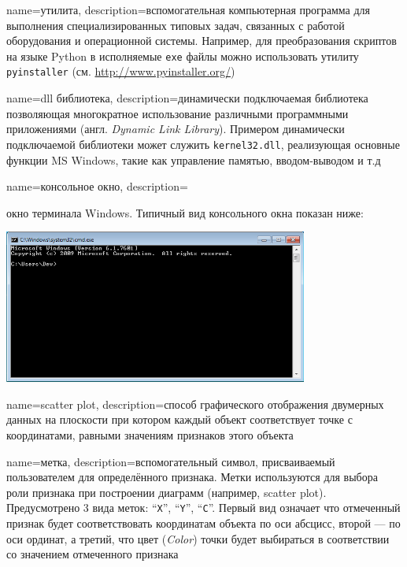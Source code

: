 {
	name=утилита,
	description={вспомогательная компьютерная программа для выполнения специализированных типовых задач, связанных с работой оборудования и операционной системы. Например, для преобразования скриптов на языке Python в исполняемые \texttt{exe} файлы можно использовать утилиту \texttt{pyinstaller} (см. \url{http://www.pyinstaller.org/})}
}

{
	name=dll библиотека,
	description={динамически подключаемая библиотека позволяющая многократное использование различными программными приложениями (англ. \textit{Dynamic Link Library}). Примером динамически подключаемой библиотеки может служить \texttt{kernel32.dll}, реализующая основные функции MS Windows, такие как управление памятью, вводом-выводом и т.д}
}

{
	name=консольное окно,
	description={окно терминала Windows. Типичный вид консольного окна показан ниже:
	\newline\begin{center}
		\includegraphics[width=0.75\textwidth]{img/terminalexample}
	\end{center}}
}

{
	name=scatter plot,
	description={способ графического отображения двумерных данных на плоскости при котором каждый объект соответствует точке с координатами, равными значениям признаков этого объекта}
}

{
	name=метка,
	description={вспомогательный символ, присваиваемый пользователем для  определённого признака. Метки используются для выбора роли признака при построении диаграмм (например, scatter plot). Предусмотрено 3 вида меток: ``\texttt{X}'', ``\texttt{Y}'', ``\texttt{C}''. Первый вид означает что отмеченный признак будет соответствовать координатам объекта по оси абсцисс, второй --- по оси ординат, а третий, что цвет (\textit{Color}) точки будет выбираться в соответствии со значением отмеченного признака}
}

